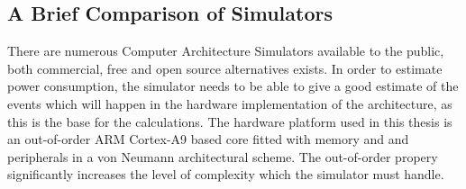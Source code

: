 \subsection{A Brief Comparison of Simulators}
\label{subsec:simulators}
There are numerous Computer Architecture Simulators available to the
public, both commercial, free and open source alternatives exists. In order
to estimate power consumption, the simulator needs to be able to give a good estimate
of the events which will happen in the hardware implementation of the architecture,
as this is the base for the calculations. The hardware platform used in this thesis
is an out-of-order ARM Cortex-A9 based core fitted with memory and and peripherals
in a von Neumann architectural scheme. The out-of-order propery significantly
increases the level of complexity which the simulator must handle.

